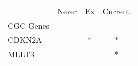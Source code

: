 \begin{tabular}{lccc}
\toprule
{} & Never & Ex & Current \\
CGC Genes &       &    &         \\
\midrule
CDKN2A    &       &  * &       * \\
MLLT3     &       &    &       * \\
\bottomrule
\end{tabular}
